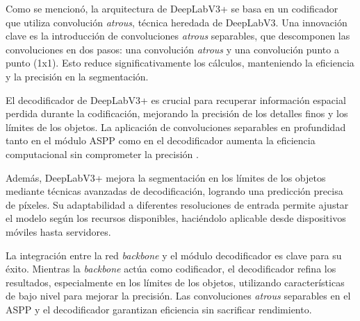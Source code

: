 Como se mencionó, la arquitectura de DeepLabV3+ se basa en un codificador que utiliza convolución \textit{atrous}, técnica heredada de DeepLabV3. Una innovación clave es la introducción de convoluciones \textit{atrous} separables, que descomponen las convoluciones en dos pasos: una convolución \textit{atrous} y una convolución punto a punto (1x1). Esto reduce significativamente los cálculos, manteniendo la eficiencia y la precisión en la segmentación.

El decodificador de DeepLabV3+ es crucial para recuperar información espacial perdida durante la codificación, mejorando la precisión de los detalles finos y los límites de los objetos. La aplicación de convoluciones separables en profundidad tanto en el módulo ASPP como en el decodificador aumenta la eficiencia computacional sin comprometer la precisión \cite{chen2018}.

Además, DeepLabV3+ mejora la segmentación en los límites de los objetos mediante técnicas avanzadas de decodificación, logrando una predicción precisa de píxeles. Su adaptabilidad a diferentes resoluciones de entrada permite ajustar el modelo según los recursos disponibles, haciéndolo aplicable desde dispositivos móviles hasta servidores.

La integración entre la red \textit{backbone} y el módulo decodificador es clave para su éxito. Mientras la \textit{backbone} actúa como codificador, el decodificador refina los resultados, especialmente en los límites de los objetos, utilizando características de bajo nivel para mejorar la precisión. Las convoluciones \textit{atrous} separables en el ASPP y el decodificador garantizan eficiencia sin sacrificar rendimiento.
